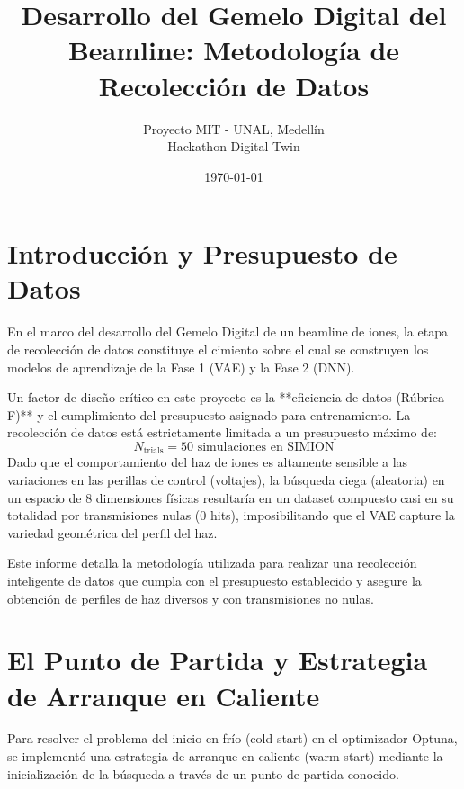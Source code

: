 \documentclass[12pt,letterpaper]{article}
\title{\textbf{Desarrollo del Gemelo Digital del Beamline: Metodología de Recolección de Datos}}
\author{Proyecto MIT - UNAL, Medellín \\ Hackathon Digital Twin}
\date{\today}
\begin{document}
\maketitle


\section{Introducción y Presupuesto de Datos}
En el marco del desarrollo del Gemelo Digital de un beamline de iones, la etapa de recolección de datos constituye el cimiento sobre el cual se construyen los modelos de aprendizaje de la Fase 1 (VAE) y la Fase 2 (DNN). 

Un factor de diseño crítico en este proyecto es la **eficiencia de datos (Rúbrica F)** y el cumplimiento del presupuesto asignado para entrenamiento. La recolección de datos está estrictamente limitada a un presupuesto máximo de:
\begin{equation}
    N_{\text{trials}} = 50 \text{ simulaciones en SIMION}
\end{equation}
Dado que el comportamiento del haz de iones es altamente sensible a las variaciones en las perillas de control (voltajes), la búsqueda ciega (aleatoria) en un espacio de 8 dimensiones físicas resultaría en un dataset compuesto casi en su totalidad por transmisiones nulas ($0$ hits), imposibilitando que el VAE capture la variedad geométrica del perfil del haz. 

Este informe detalla la metodología utilizada para realizar una recolección inteligente de datos que cumpla con el presupuesto establecido y asegure la obtención de perfiles de haz diversos y con transmisiones no nulas.

\section{El Punto de Partida y Estrategia de Arranque en Caliente}
Para resolver el problema del inicio en frío (cold-start) en el optimizador Optuna, se implementó una estrategia de arranque en caliente (warm-start) mediante la inicialización de la búsqueda a través de un punto de partida conocido.
\end{document}
